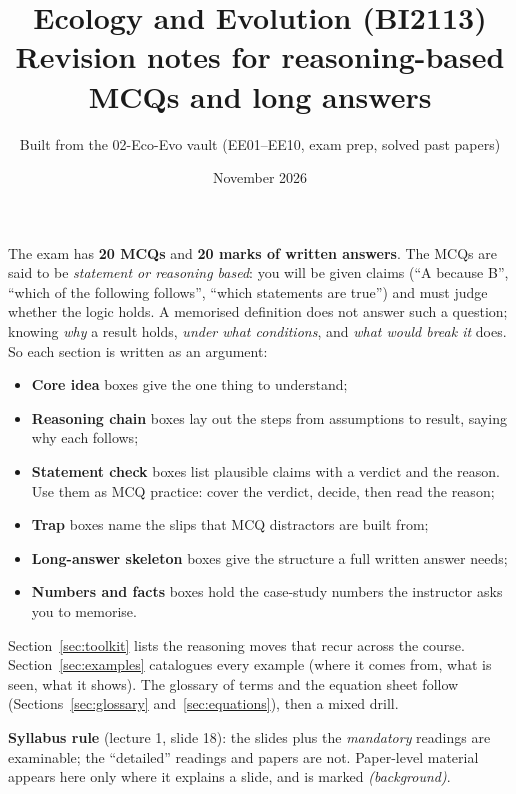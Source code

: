 \documentclass[11pt,a4paper]{article}
\title{\Huge\bfseries Ecology and Evolution (BI2113)\\[4pt]
\Large Revision notes for reasoning-based MCQs and long answers}
\author{Built from the 02-Eco-Evo vault (EE01--EE10, exam prep, solved past papers)}
\date{November 2026}
\begin{document}
\maketitle
\thispagestyle{empty}

\begin{tcolorbox}[colback=NavyBlue!4,colframe=NavyBlue!70!black,title={How to use these notes}]
The exam has \textbf{20 MCQs} and \textbf{20 marks of written answers}. The MCQs are said to be
\emph{statement or reasoning based}: you will be given claims (``A because B'', ``which of the following follows'',
``which statements are true'') and must judge whether the logic holds. A memorised definition does not answer
such a question; knowing \emph{why} a result holds, \emph{under what conditions}, and \emph{what would break it} does.
So each section is written as an argument:
\begin{itemize}
\item \textbf{Core idea} boxes give the one thing to understand;
\item \textbf{Reasoning chain} boxes lay out the steps from assumptions to result, saying why each follows;
\item \textbf{Statement check} boxes list plausible claims with a verdict and the reason. Use them as MCQ practice: cover the verdict, decide, then read the reason;
\item \textbf{Trap} boxes name the slips that MCQ distractors are built from;
\item \textbf{Long-answer skeleton} boxes give the structure a full written answer needs;
\item \textbf{Numbers and facts} boxes hold the case-study numbers the instructor asks you to memorise.
\end{itemize}
Section~\ref{sec:toolkit} lists the reasoning moves that recur across the course. Section~\ref{sec:examples} catalogues
every example (where it comes from, what is seen, what it shows). The glossary of terms and the equation sheet follow
(Sections~\ref{sec:glossary} and~\ref{sec:equations}), then a mixed drill.

\textbf{Syllabus rule} (lecture 1, slide 18): the slides plus the \emph{mandatory} readings are examinable; the
``detailed'' readings and papers are not. Paper-level material appears here only where it explains a slide, and is
marked \emph{(background)}.
\end{tcolorbox}

\tableofcontents
\newpage

















\end{document}
